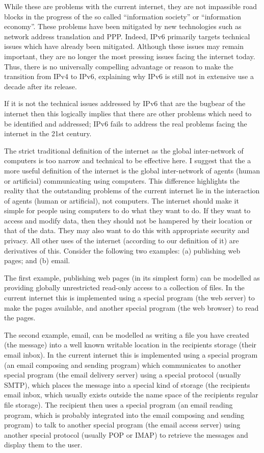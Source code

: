\documentclass[british,english]{article}
\begin{document}
While these are problems with the current internet, they are not impassible
road blocks in the progress of the so called {}``information society''
or {}``information economy''. These problems have been mitigated
by new technologies such as network address translation and PPP. Indeed,
IPv6 primarily targets technical issues which have already been mitigated.
Although these issues may remain important, they are no longer the
most pressing issues facing the internet today. Thus, there is no
universally compelling advantage or reason to make the transition
from IPv4 to IPv6, explaining why IPv6 is still not in extensive use
a decade after its release. 

If it is not the technical issues addressed by IPv6 that are the bugbear
of the internet then this logically implies that there are other problems
which need to be identified and addressed; IPv6 fails to address the
real problems facing the internet in the 21st century.

The strict traditional definition of the internet as the global inter-network
of computers is too narrow and technical to be effective here. I suggest
that the a more useful definition of the internet is the global inter-network
of agents (human or artificial) communicating using computers. This
difference highlights the reality that the outstanding problems of
the current internet lie in the interaction of agents (human or artificial),
not computers. The internet should make it simple for people using
computers to do what they want to do. If they want to access and modify
data, then they should not be hampered by their location or that of
the data. They may also want to do this with appropriate security
and privacy. All other uses of the internet (according to our definition
of it) are derivatives of this. Consider the following two examples:
(a) publishing web pages; and (b) email. 

The first example, publishing web pages (in its simplest form) can
be modelled as providing globally unrestricted read-only access to
a collection of files. In the current internet this is implemented
using a special program (the web server) to make the pages available,
and another special program (the web browser) to read the pages.

The second example, email, can be modelled as writing a file you have
created (the message) into a well known writable location in the recipients
storage (their email inbox). In the current internet this is implemented
using a special program (an email composing and sending program) which
communicates to another special program (the email delivery server)
using a special protocol (usually SMTP), which places the message
into a special kind of storage (the recipients email inbox, which
usually exists outside the name space of the recipients regular file
storage). The recipient then uses a special program (an email reading
program, which is probably integrated into the email composing and
sending program) to talk to another special program (the email access
server) using another special protocol (usually POP or IMAP) to retrieve
the messages and display them to the user.
\end{document}
